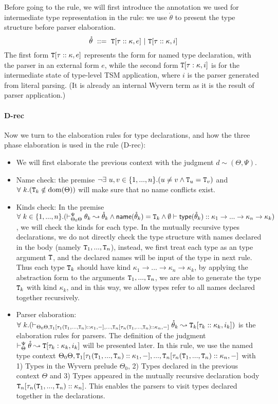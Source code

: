 Before going to the rule, we will first introduce the annotation we used for intermediate type representation in the rule: we use $\mathring\theta$ to present the type structure before parser elaboration. 
\[
      \mathring\theta~::=~\mathtt{T}[\tau::\kappa,e] ~| ~\mathtt{T}[\tau::\kappa,i]
\]
The first form $\mathtt{T}[\tau::\kappa,e]$ represents the form for named type declaration, with the parser in an external form $e$, while the second form $\mathtt{T}[\tau:\kappa,i]$ is for the intermediate state of type-level TSM application, where $i$ is the parser generated from literal parsing. (It is already an internal Wyvern term as it is the result of parser application.) 

\paragraph{D-rec}Now we turn to the elaboration rules for type declarations, and how the three phase elaboration is used in the rule (D-rec):
\begin{itemize}\itemsep0pt
\item We will first elaborate the previous context with the judgment $d\sim(\Theta,\Psi)$.
\item Name check: the premise $\neg\exists~u,v\in\{1,...,n\}.(u\neq v\land\mathtt{T}_u=\mathtt{T}_v)$ and $\forall~k.(\mathtt{T}_k\notin\text{dom}(\Theta))$ will make sure that no name conflicts exist.
\item Kinds check: In the premise $\forall~k\in\{1,...,n\}.(\vdash_{\Theta_0\Theta}^{\Psi}\theta_k\leadsto \mathring\theta_k\land \mathsf{name}(\mathring\theta_k)=\mathtt{T}_k \land \emptyset\vdash\mathsf{type}(\mathring\theta_k)::\kappa_1\rightarrow...\rightarrow\kappa_n\rightarrow\kappa_k)$, we will check the kinds for each type. In the mutually recursive types declarations, we do not directly check the type structure with names declared in the body (namely $\mathtt{T}_1,...,\mathtt{T}_n$), instead, we first treat each type as an type argument $\mathtt{T}$, and the declared names will be input of the type in next rule. Thus each type $\mathtt{T}_k$ should have kind $\kappa_1\rightarrow ... \rightarrow \kappa_n\rightarrow\kappa_k$, by applying the abstraction form to the arguments $\mathtt{T}_1,...,\mathtt{T}_n$, we are able to generate the type $\mathtt{T}_k$ with kind $\kappa_k$, and in this way, we allow types refer to all names declared together recursively.
\item Parser elaboration: $\forall~k.(\vdash_{\Theta_0\Theta,\mathtt{T}_1[\tau_1(\mathtt{T}_1,...,\mathtt{T}_n)::\kappa_1,-],...,\mathtt{T}_n[\tau_n(\mathtt{T}_1,...,\mathtt{T}_n)::\kappa_n,-]}\mathring\theta_k\leadsto \mathtt{T}_k[\tau_k::\kappa_k,i_k])$ is the elaboration rules for parsers. The definition of the judgment $\vdash_{\Theta}^{\Psi}\mathring\theta\leadsto\mathtt{T}[\tau_k:\kappa_k,i_k]$ will be presented later. In this rule, we use the named type context $\Theta_0\Theta,\mathtt{T}_1[\tau_1(\mathtt{T}_1,...,\mathtt{T}_n)::\kappa_1,-],...,\mathtt{T}_n[\tau_n(\mathtt{T}_1,...,\mathtt{T}_n)::\kappa_n,-]$ with 1) Types in the Wyvern prelude $\Theta_0$, 2) Types declared in the previous context $\Theta$ and 3) Types appeared in the mutually recursive declaration body  $\mathtt{T}_n[\tau_n(\mathtt{T}_1,...,\mathtt{T}_n)::\kappa_n]$. This enables the parsers to visit types declared together in the declarations.
\end{itemize}

